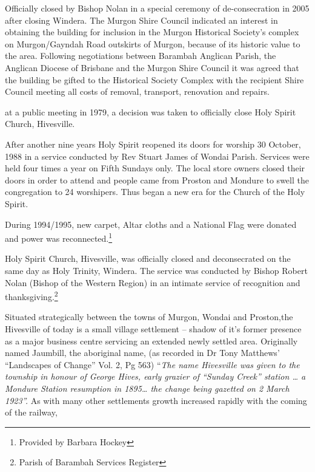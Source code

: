 Officially closed by Bishop Nolan in a special ceremony of de-consecration in 2005 after closing Windera. The Murgon Shire Council indicated an interest in obtaining the building for inclusion in the Murgon Historical Society's complex on Murgon/Gayndah Road outskirts of Murgon, because of its historic value to the area. Following negotiations between Barambah Anglican Parish, the Anglican Diocese of Brisbane and the Murgon Shire Council it was agreed that the building be gifted to the Historical Society Complex with the recipient Shire Council meeting all costs of removal, transport, renovation and repairs.



at a public meeting in 1979, a decision was taken to officially close Holy Spirit Church, Hivesville.



After another nine years Holy Spirit reopened its doors for worship 30 October, 1988 in a service conducted by Rev Stuart James of Wondai Parish. Services were held four times a year on Fifth Sundays only. The local store owners closed their doors in order to attend and people came from Proston and Mondure to swell the congregation to 24 worshipers. Thus began a new era for the Church of the Holy Spirit.



During 1994/1995, new carpet, Altar cloths and a National Flag were donated and power was reconnected.\footnote{Provided by Barbara Hockey}


Holy Spirit Church, Hivesville, was officially closed and deconsecrated on the same day as Holy Trinity, Windera. The service was conducted by Bishop Robert Nolan (Bishop of the Western Region) in an intimate service of recognition and thanksgiving.\footnote{Parish of Barambah Services Register}


Situated strategically between the towns of Murgon, Wondai and Proston,the Hivesville of today is a small village settlement -- shadow of it's former presence as a major business centre servicing an extended newly settled area. Originally named Jaumbill, the aboriginal name, (as recorded in Dr Tony Matthews' ``Landscapes of Change'' Vol. 2, Pg 563) ``\emph{The name Hivesville was given to the township in honour of George Hives, early grazier of ``Sunday Creek'' station \ldots{} a Mondure Station resumption in 1895\ldots{} the change being gazetted on 2 March 1923''.} As with many other settlements growth increased rapidly with the coming of the railway,



